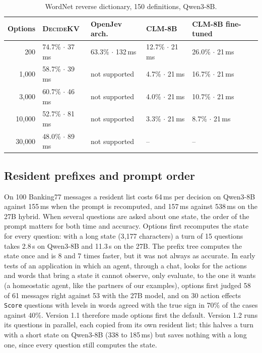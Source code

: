 \documentclass[11pt]{article}
\newcommand{\dkv}{\textsc{DecideKV}}
\newcommand{\ms}{\,ms}
\begin{document}
\begin{table}[t]
\centering\small
\caption{WordNet reverse dictionary, 150 definitions, Qwen3-8B.}\label{tab:scale}
\begin{tabular}{rllll}
\toprule
Options & \dkv & OpenJev arch. & CLM-8B & CLM-8B fine-tuned \\
\midrule
200 & 74.7\% $\cdot$ 37\ms & 63.3\% $\cdot$ 132\ms & 12.7\% $\cdot$ 21\ms & 26.0\% $\cdot$ 21\ms \\
1{,}000 & 58.7\% $\cdot$ 39\ms & not supported & 4.7\% $\cdot$ 21\ms & 16.7\% $\cdot$ 21\ms \\
3{,}000 & 60.7\% $\cdot$ 46\ms & not supported & 4.0\% $\cdot$ 21\ms & 10.7\% $\cdot$ 21\ms \\
10{,}000 & 52.7\% $\cdot$ 81\ms & not supported & 3.3\% $\cdot$ 21\ms & 8.7\% $\cdot$ 21\ms \\
30{,}000 & 48.0\% $\cdot$ 89\ms & not supported & -- & -- \\
\bottomrule
\end{tabular}
\end{table}

\subsection{Resident prefixes and prompt order}\label{sec:order}
On 100 Banking77 messages a resident list costs 64\ms{} per decision on Qwen3-8B against 155\ms{} when the prompt is
recomputed, and 157\ms{} against 538\ms{} on the 27B hybrid. When several questions are asked about one state, the
order of the prompt matters for both time and accuracy. Options first recomputes the state for every question: with a
long state (3{,}177 characters) a turn of 15 questions takes 2.8\,s on Qwen3-8B and 11.3\,s on the 27B. The prefix tree
computes the state once and is 8 and 7 times faster, but it was not always as accurate. In early tests of an
application in which an agent, through a chat, looks for the actions and words that bring a state it cannot observe,
only evaluate, to the one it wants (a homeostatic agent, like the partners of our examples), options first judged 58
of 61 messages right against 53 with the 27B model, and on 30 action effects \texttt{Score} questions with
levels in words agreed with the true sign in 70\% of the cases against 40\%. Version 1.1 therefore made options first
the default. Version 1.2 runs its questions in parallel, each copied from its own resident list; this halves a turn
with a short state on Qwen3-8B (338 to 185\ms) but saves nothing with a long one, since every question still computes
the state.
\end{document}
